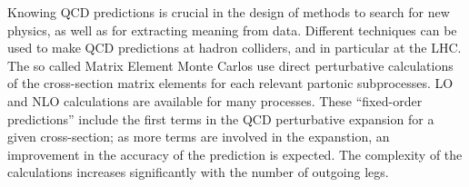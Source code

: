 Knowing QCD predictions is crucial in the design of methods to search for new physics, as well as for extracting meaning from data. Different techniques can be used to make QCD predictions at hadron colliders, and in particular at the LHC. The so called Matrix Element Monte Carlos use direct perturbative calculations of the cross-section matrix elements  %
for each relevant partonic subprocesses. LO and NLO calculations are available for many processes.   These ``fixed-order predictions'' include the first terms in the QCD perturbative expansion for a given cross-section; as more terms are involved in the expanstion, an improvement in the accuracy of the prediction is expected.  The complexity of the calculations increases significantly with the number of outgoing legs. %



